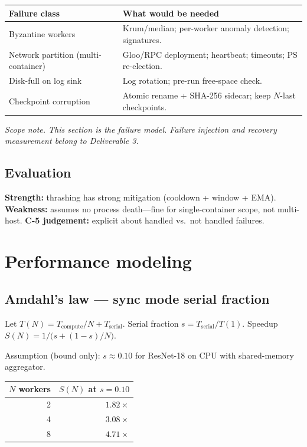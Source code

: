 \documentclass[11pt,a4paper]{article}
\begin{document}
\begin{table}[htbp]
  \centering
  \small
  \begin{tabularx}{\linewidth}{@{}l L@{}}
    \toprule
    \textbf{Failure class} & \textbf{What would be needed} \\
    \midrule
    Byzantine workers & Krum/median; per-worker anomaly detection; signatures. \\
    Network partition (multi-container) & Gloo/RPC deployment; heartbeat; timeouts; PS re-election. \\
    Disk-full on log sink & Log rotation; pre-run free-space check. \\
    Checkpoint corruption & Atomic rename + SHA-256 sidecar; keep $N$-last checkpoints. \\
    \bottomrule
  \end{tabularx}
\end{table}

\noindent\textit{Scope note. This section is the failure \emph{model}. Failure injection and recovery measurement belong to Deliverable 3.}

\subsection{Evaluation}
\textbf{Strength:} thrashing has strong mitigation (cooldown + window + EMA). \textbf{Weakness:} assumes no process death---fine for single-container scope, not multi-host. \textbf{C-5 judgement:} explicit about handled vs.\ not handled failures.

\section{Performance modeling}

\subsection{Amdahl's law --- sync mode serial fraction}

Let $T(N) = T_{\text{compute}}/N + T_{\text{serial}}$. Serial fraction $s = T_{\text{serial}}/T(1)$. Speedup $S(N) = 1/\bigl(s + (1-s)/N\bigr)$.

Assumption (bound only): $s \approx 0.10$ for ResNet-18 on CPU with shared-memory aggregator.

\begin{table}[htbp]
  \centering
  \begin{tabular}{@{}r r@{}}
    \toprule
    $N$ workers & $S(N)$ at $s=0.10$ \\
    \midrule
    2 & $1.82\times$ \\
    4 & $3.08\times$ \\
    8 & $4.71\times$ \\
    \bottomrule
  \end{tabular}
\end{table}
\end{document}
